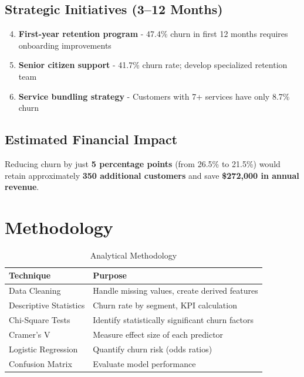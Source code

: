 \documentclass[11pt,a4paper]{article}
\begin{document}
\subsection{Strategic Initiatives (3--12 Months)}

\begin{enumerate}[label=\color{accent}\textbf{\theenumi.}, leftmargin=*]
    \setcounter{enumi}{3}
    \item \textbf{First-year retention program} - 47.4\% churn in first 12 months requires onboarding improvements
    \item \textbf{Senior citizen support} - 41.7\% churn rate; develop specialized retention team
    \item \textbf{Service bundling strategy} - Customers with 7+ services have only 8.7\% churn
\end{enumerate}

\subsection{Estimated Financial Impact}

\begin{tcolorbox}[
    colback=retentiongreen!5,
    colframe=retentiongreen!50,
    arc=8pt,
    left=15pt,
    right=15pt
]
Reducing churn by just \textbf{5 percentage points} (from 26.5\% to 21.5\%) would retain approximately \textbf{350 additional customers} and save \textbf{\$272,000 in annual revenue}.
\end{tcolorbox}

\section{Methodology}

\begin{table}[H]
\centering
\begin{tabular}{p{4cm} p{7cm}}
\toprule
\rowcolor{primary!10}
\textbf{Technique} & \textbf{Purpose} \\
\midrule
Data Cleaning & Handle missing values, create derived features \\
Descriptive Statistics & Churn rate by segment, KPI calculation \\
Chi-Square Tests & Identify statistically significant churn factors \\
Cramer's V & Measure effect size of each predictor \\
Logistic Regression & Quantify churn risk (odds ratios) \\
Confusion Matrix & Evaluate model performance \\
\bottomrule
\end{tabular}
\caption{Analytical Methodology}
\end{table}
\end{document}
